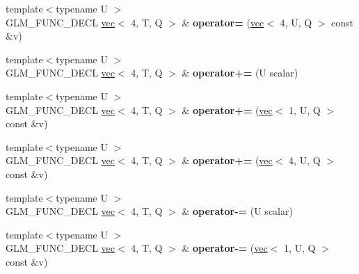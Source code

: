 \begin{DoxyCompactItemize}
\item 
\mbox{\label{structglm_1_1vec_3_014_00_01T_00_01Q_01_4_aa7ef3d5fd9dc5c99d9b7772451463a56}} 
{\footnotesize template$<$typename U $>$ }\\G\+L\+M\+\_\+\+F\+U\+N\+C\+\_\+\+D\+E\+CL \hyperlink{structglm_1_1vec}{vec}$<$ 4, T, Q $>$ \& {\bfseries operator=} (\hyperlink{structglm_1_1vec}{vec}$<$ 4, U, Q $>$ const \&v)
\item 
\mbox{\label{structglm_1_1vec_3_014_00_01T_00_01Q_01_4_a51ba1da558471cb6e2bc8f3870b88db5}} 
{\footnotesize template$<$typename U $>$ }\\G\+L\+M\+\_\+\+F\+U\+N\+C\+\_\+\+D\+E\+CL \hyperlink{structglm_1_1vec}{vec}$<$ 4, T, Q $>$ \& {\bfseries operator+=} (U scalar)
\item 
\mbox{\label{structglm_1_1vec_3_014_00_01T_00_01Q_01_4_a1f72eb246038606882fc1baf40752008}} 
{\footnotesize template$<$typename U $>$ }\\G\+L\+M\+\_\+\+F\+U\+N\+C\+\_\+\+D\+E\+CL \hyperlink{structglm_1_1vec}{vec}$<$ 4, T, Q $>$ \& {\bfseries operator+=} (\hyperlink{structglm_1_1vec}{vec}$<$ 1, U, Q $>$ const \&v)
\item 
\mbox{\label{structglm_1_1vec_3_014_00_01T_00_01Q_01_4_a0ecc88837b973bdf129d60381e6e481c}} 
{\footnotesize template$<$typename U $>$ }\\G\+L\+M\+\_\+\+F\+U\+N\+C\+\_\+\+D\+E\+CL \hyperlink{structglm_1_1vec}{vec}$<$ 4, T, Q $>$ \& {\bfseries operator+=} (\hyperlink{structglm_1_1vec}{vec}$<$ 4, U, Q $>$ const \&v)
\item 
\mbox{\label{structglm_1_1vec_3_014_00_01T_00_01Q_01_4_ad007bb786d8d34db95ee6fd2661cd1b8}} 
{\footnotesize template$<$typename U $>$ }\\G\+L\+M\+\_\+\+F\+U\+N\+C\+\_\+\+D\+E\+CL \hyperlink{structglm_1_1vec}{vec}$<$ 4, T, Q $>$ \& {\bfseries operator-\/=} (U scalar)
\item 
\mbox{\label{structglm_1_1vec_3_014_00_01T_00_01Q_01_4_a7cf5d44f1e5c5a5cc24c6d8fc4799b81}} 
{\footnotesize template$<$typename U $>$ }\\G\+L\+M\+\_\+\+F\+U\+N\+C\+\_\+\+D\+E\+CL \hyperlink{structglm_1_1vec}{vec}$<$ 4, T, Q $>$ \& {\bfseries operator-\/=} (\hyperlink{structglm_1_1vec}{vec}$<$ 1, U, Q $>$ const \&v)

\end{DoxyCompactItemize}
